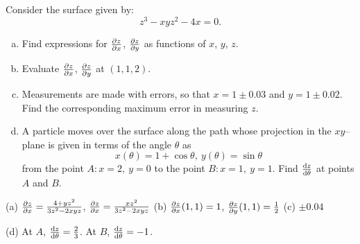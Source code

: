 \subsection*{\Application}

\begin{question}[M200 2006D] %
Consider the surface given by:
\begin{equation*}
z^3 - xyz^2 - 4x = 0.
\end{equation*}
\begin{enumerate}[(a)]
\item 
Find expressions for $\pdiff{z}{x}$, $\pdiff{z}{y}$ as functions of $x$, $y$, 
$z$.
\item
Evaluate $\pdiff{z}{x}$, $\pdiff{z}{y}$ at $(1, 1, 2)$.
\item
Measurements are made with errors, so that $x = 1 \pm 0.03$ and 
$y = 1 \pm 0.02$.
Find the corresponding maximum error in measuring $z$.
\item
A particle moves over the surface along the path whose projection in the
$xy$--plane is given in terms of the angle $\theta$ as
\begin{equation*}
x(\theta) = 1 + \cos\theta,\ y(\theta) = \sin\theta
\end{equation*}
from the point $A : x = 2,\ y = 0$ to the point $B : x = 1,\ y = 1$.
Find $\diff{z}{\theta}$ at points $A$ and $B$.
\end{enumerate}
\end{question}

%

\begin{answer}
(a) $\pdiff{z}{x} = \frac{4+yz^2}{3z^2-2xyz}$,
    $\pdiff{z}{x} = \frac{xz^2}{3z^2-2xyz}$\qquad
(b) $\pdiff{z}{x}(1,1) = 1$,
    $\pdiff{z}{y}(1,1) = \frac{1}{2}$\qquad
(c) $\pm 0.04$\qquad

(d) At $A$, $ \diff{z}{\theta} =\frac{2}{3}$.\qquad
At $B$, $\diff{z}{\theta}  = -1$.
\end{answer}

